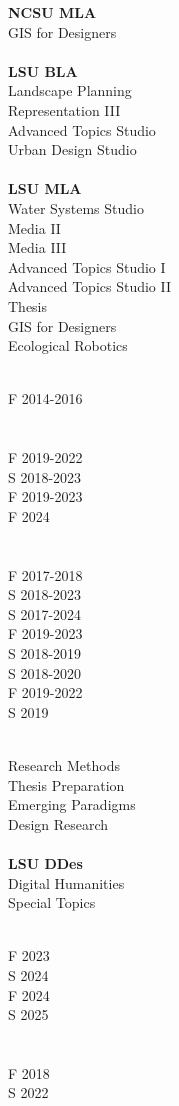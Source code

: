 \documentclass[10pt]{designcv}
\begin{document}
\begin{minipage}[t]{0.3\textwidth} 
\textbf{NCSU MLA}\\
GIS for Designers\\
\ \\
\textbf{LSU BLA}\\
Landscape Planning\\
Representation III\\
Advanced Topics Studio\\
Urban Design Studio\\
\ \\
\textbf{LSU MLA}\\
Water Systems Studio\\
Media II\\
Media III\\
Advanced Topics Studio I\\
Advanced Topics Studio II\\
Thesis\\
GIS for Designers\\
Ecological Robotics\\
\end{minipage}
\begin{minipage}[t]{0.2\textwidth} 
\ \\
F 2014-2016\\
\ \\
\ \\
F 2019-2022\\
S 2018-2023\\
F 2019-2023\\
F 2024\\
\ \\
\ \\
F 2017-2018\\
S 2018-2023\\
S 2017-2024\\
F 2019-2023\\
S 2018-2019\\
S 2018-2020\\
F 2019-2022\\
S 2019\\
\end{minipage}
\begin{minipage}[t]{0.3\textwidth}
\ \\
Research Methods\\
Thesis Preparation\\
Emerging Paradigms\\
Design Research\\
\ \\
\textbf{LSU DDes}\\
Digital Humanities\\
Special Topics\\
\end{minipage}
\hfill
\begin{minipage}[t]{0.2\textwidth}
\ \\
F 2023\\
S 2024\\
F 2024\\
S 2025\\
\ \\
\ \\
F 2018\\
S 2022\\
\end{minipage}
\hfill
\end{document}
